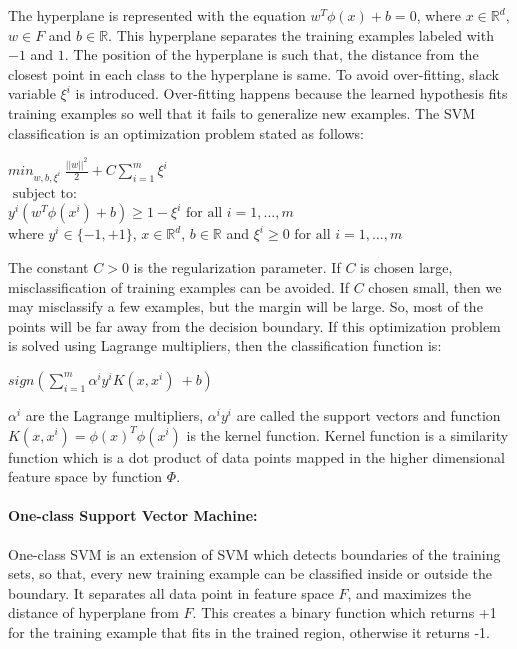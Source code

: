 \documentclass[12pt,oneside,a4paper]{article}
\begin{document}
The hyperplane is represented with the equation $w^{T} \phi(x) + b = 0$, where $x \in \mathbb{R}^d$, $w \in F$ and $b \in \mathbb{R}$. This hyperplane separates the training examples labeled with $-1$ and $1$. The position of the hyperplane is such that, the distance from the closest point in each class to the hyperplane is same. To avoid over-fitting, slack variable $\xi^{i}$ is introduced. Over-fitting happens because the learned hypothesis fits training examples so well that it fails to generalize new examples. The SVM classification is an optimization problem stated as follows:\cite{svm} \cite{svm-ml}

\begin{center}
  ${min}_{w,b,\xi^i} \ \frac{||w||^2}{2} + C \sum_{i=1}^m \xi^i$ \\
  $\mbox{ subject to: }$ \\
  $y^i( w^T \phi(x^i) + b) \geq 1 - \xi^i \mbox{ for all } i = 1, \dots, m$ \\
  where $y^{i} \in \{-1, +1\}$, $x \in \mathbb{R}^d$, $b \in \mathbb{R}$ and $\xi^i \geq 0 \mbox{ for all } i = 1, \dots, m$ \\
\end{center}

 The constant $C > 0$ is the regularization parameter. If $C$ is chosen large, misclassification of training examples can be avoided. If $C$ chosen small, then we may misclassify a few examples, but the margin will be large. So, most of the points will be far away from the decision boundary. If this optimization problem is solved using Lagrange multipliers, then the classification function is:

\begin{center}
$sign(\sum_{i=1}^m \alpha^i y^i K(x,x^i) \ + b)$
\end{center}

$\alpha^i$ are the Lagrange multipliers, $\alpha^i y^i$ are called the support vectors and function $K(x,x^i) = \phi(x)^T \phi(x^i)$ is the kernel function. Kernel function is a similarity function which is a dot product of data points mapped in the higher dimensional feature space by function $\Phi$.

\paragraph{One-class Support Vector Machine:}

One-class SVM is an extension of SVM which detects boundaries of the training sets, so that, every new training example can be classified inside or outside the boundary. It separates all data point in feature space $F$, and maximizes the distance of hyperplane from $F$. This creates a binary function which returns +1 for the training example that fits in the trained region, otherwise it returns -1.
\end{document}
